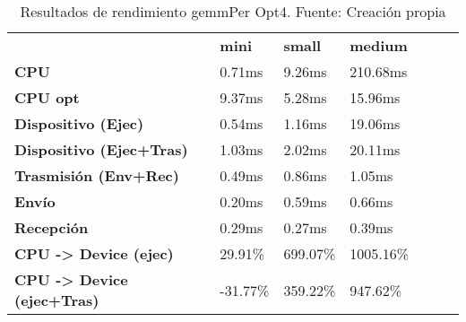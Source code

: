 \begin{table}[H]
    \centering
    \begin{tabular}{lllllll}
    \rowcolor[HTML]{DAE8FC} \ &  \textbf{mini} &  \textbf{	small} &  \textbf{	medium} \\
    \cellcolor[HTML]{DAE8FC} \textbf{CPU} & 0.71ms & 	9.26ms & 	210.68ms \\
    \rowcolor[HTML]{EFEFEF} \cellcolor[HTML]{DAE8FC} \textbf{CPU opt} & 9.37ms & 	5.28ms & 	15.96ms \\
    \cellcolor[HTML]{DAE8FC} \textbf{Dispositivo (Ejec)} & 0.54ms & 	1.16ms & 	19.06ms \\
    \rowcolor[HTML]{EFEFEF} \cellcolor[HTML]{DAE8FC} \textbf{Dispositivo (Ejec+Tras)} & 1.03ms & 	2.02ms & 	20.11ms \\
    \cellcolor[HTML]{DAE8FC} \textbf{Trasmisión (Env+Rec)} & 0.49ms & 	0.86ms & 	1.05ms \\
    \rowcolor[HTML]{EFEFEF} \cellcolor[HTML]{DAE8FC} \textbf{Envío} & 0.20ms & 	0.59ms & 	0.66ms \\
    \cellcolor[HTML]{DAE8FC} \textbf{Recepción} & 0.29ms & 	0.27ms & 	0.39ms \\
    \rowcolor[HTML]{EFEFEF} \cellcolor[HTML]{DAE8FC} \textbf{CPU -> Device (ejec)} & 29.91\% & 	699.07\% & 	1005.16\% \\
    \cellcolor[HTML]{DAE8FC} \textbf{CPU -> Device (ejec+Tras)} & -31.77\% & 	359.22\% & 	947.62\% \\
    \end{tabular}
    \caption[Resultados de rendimiento gemmPer Opt4]{{Resultados de rendimiento gemmPer Opt4. Fuente: Creación propia}}
    \label{table_test_gemmPer_Opt4_hw_performanceResults}
\end{table}